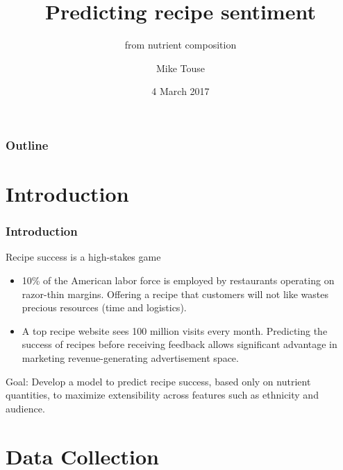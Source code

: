 \documentclass{beamer}
\title{Predicting recipe sentiment}
\subtitle{from nutrient composition}
\author{Mike Touse}
\date{4 March 2017}
\begin{document}
\begin{frame}
	\titlepage
\end{frame}

\begin{frame}
	\frametitle{Outline}
	\tableofcontents
\end{frame}

\section{Introduction}

\begin{frame}
	\frametitle{Introduction}
	\begin{block}{Recipe success is a high-stakes game}
		\begin{itemize}
			\item 10\% of the American labor force is employed by restaurants operating on razor-thin margins.  Offering a recipe that customers will not like wastes precious resources (time and logistics).
			\item A top recipe website sees 100 million visits every month.  Predicting the success of recipes before receiving feedback allows significant advantage in marketing revenue-generating advertisement space.
		\end{itemize}  	
	\end{block}

	\begin{alertblock}{Goal:}
		Develop a model to predict recipe success, based only on nutrient quantities, to maximize extensibility across features such as ethnicity and audience.
	\end{alertblock}

\end{frame}



\section{Data Collection}
\end{document}
